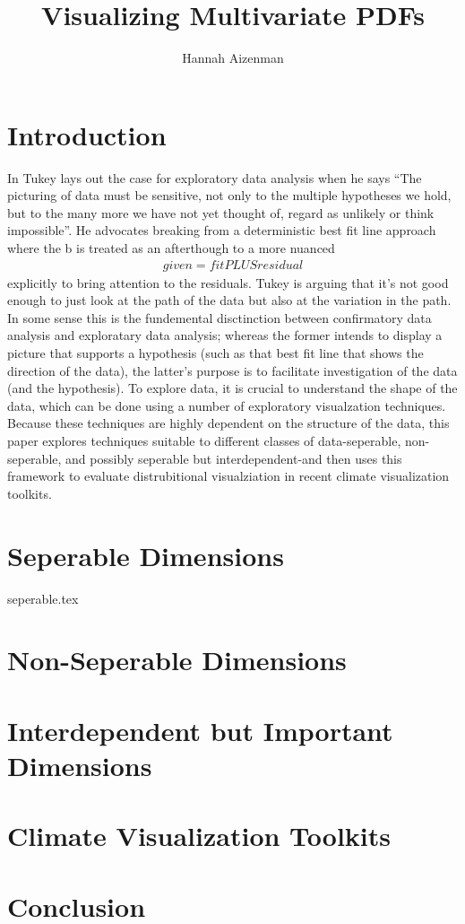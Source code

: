 \documentclass[letterpaper,onecolumn,titlepage]{Ythesis}
\title{Visualizing Multivariate PDFs}
\author{Hannah Aizenman}
\begin{document}
\makefrontmatter

\section{Introduction}
In \cite{tukey1975m} Tukey lays out the case for exploratory data analysis when
he says ``The picturing of data must be sensitive, not only to the multiple hypotheses
we hold, but to the many more we have not yet thought of, regard as unlikely or
think impossible''. He advocates breaking from a deterministic 
best fit line approach where the b is treated as an afterthough to a more
nuanced
\begin{align*}
  given = fit PLUS residual
\end{align*}
explicitly to bring attention to the residuals. Tukey is arguing that it's not
good enough to just look at the path of the data but also at the variation in
the path. In some sense this is the fundemental disctinction between
confirmatory data analysis and exploratary data analysis; whereas the former
intends to display a picture that supports a hypothesis (such as that best fit
line that shows the direction of the data), the latter's purpose is to
facilitate investigation of the data (and the hypothesis). To explore data, it
is crucial to understand the shape of the data, which can be done using a
number of exploratory visualzation techniques. Because these techniques are
highly dependent on the structure of the data, this paper explores techniques suitable to different classes of data-seperable, non-seperable, and
possibly seperable but interdependent-and then uses this framework to evaluate
distrubitional visualziation in recent climate visualization toolkits. 

\section{Seperable Dimensions}
{seperable.tex}
\section{Non-Seperable Dimensions}
\section{Interdependent but Important Dimensions}
\section{Climate Visualization Toolkits}

\section{Conclusion}
\label{sec:conclusion}


\pagebreak


\end{document}
